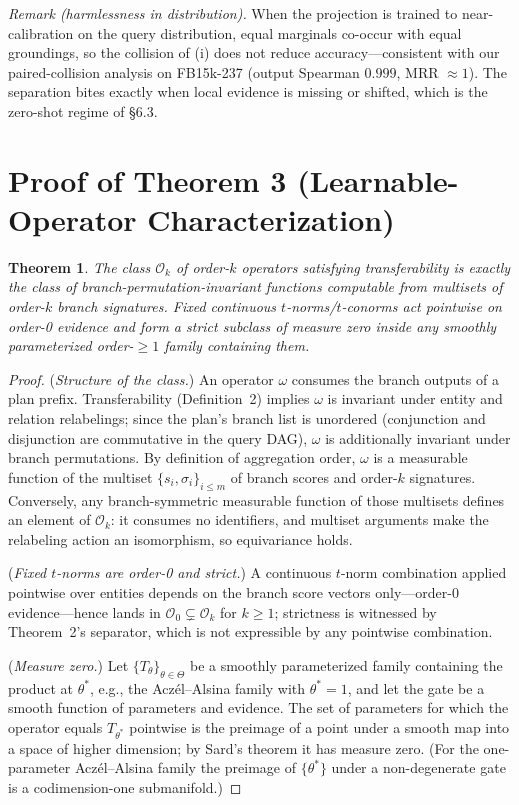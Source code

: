\documentclass[journal]{IEEEtran}
\newtheorem{theorem*}{Theorem}
\begin{document}
\emph{Remark (harmlessness in distribution).} When the projection is
trained to near-calibration on the query distribution, equal marginals
co-occur with equal groundings, so the collision of (i) does not reduce
accuracy---consistent with our paired-collision analysis on FB15k-237
(output Spearman $0.999$, MRR $\approx 1$). The separation bites exactly
when local evidence is missing or shifted, which is the zero-shot regime
of \S6.3.

\section{Proof of Theorem 3 (Learnable-Operator Characterization)}

\begin{theorem*}
The class $\mathcal O_k$ of order-$k$ operators satisfying transferability
is exactly the class of branch-permutation-invariant functions computable
from multisets of order-$k$ branch signatures. Fixed continuous
$t$-norms/$t$-conorms act pointwise on order-0 evidence and form a strict
subclass of measure zero inside any smoothly parameterized order-$\ge1$
family containing them.
\end{theorem*}
\begin{proof}
(\emph{Structure of the class.}) An operator $\omega$ consumes the branch
outputs of a plan prefix. Transferability (Definition~2) implies $\omega$
is invariant under entity and relation relabelings; since the plan's
branch list is unordered (conjunction and disjunction are commutative in
the query DAG), $\omega$ is additionally invariant under branch
permutations. By definition of aggregation order, $\omega$ is a measurable
function of the multiset $\{s_i,\sigma_i\}_{i\le m}$ of branch scores and
order-$k$ signatures. Conversely, any branch-symmetric measurable function
of those multisets defines an element of $\mathcal O_k$: it consumes no
identifiers, and multiset arguments make the relabeling action an
isomorphism, so equivariance holds.

(\emph{Fixed $t$-norms are order-0 and strict.}) A continuous $t$-norm
combination applied pointwise over entities depends on the branch score
vectors only---order-0 evidence---hence lands in
$\mathcal O_0\subsetneq\mathcal O_k$ for $k\ge1$; strictness is witnessed
by Theorem~2's separator, which is not expressible by any pointwise
combination.

(\emph{Measure zero.}) Let $\{T_\theta\}_{\theta\in\Theta}$ be a smoothly
parameterized family containing the product at $\theta^\ast$, e.g., the
Acz\'el--Alsina family with $\theta^\ast=1$, and let the gate be a smooth
function of parameters and evidence. The set of parameters for which the
operator equals $T_{\theta^\ast}$ pointwise is the preimage of a point
under a smooth map into a space of higher dimension; by Sard's theorem it
has measure zero. (For the one-parameter Acz\'el--Alsina family the
preimage of $\{\theta^\ast\}$ under a non-degenerate gate is a
codimension-one submanifold.)
\end{proof}
\end{document}
